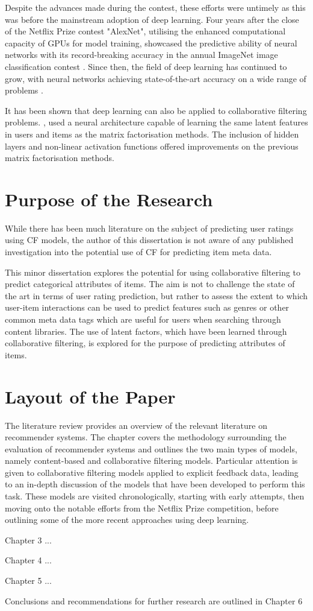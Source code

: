 Despite the advances made during the contest, these efforts were untimely as this was before the mainstream adoption of deep learning. Four years after the close of the Netflix Prize contest "AlexNet", utilising the enhanced computational capacity of GPUs for model training, showcased the predictive ability of neural networks with its record-breaking accuracy in the annual ImageNet image classification contest \parencite{krizhevsky2012imagenet}. Since then, the field of deep learning has continued to grow, with neural networks achieving state-of-the-art accuracy on a wide range of problems \parencite{alom2018history}.

It has been shown that deep learning can also be applied to collaborative filtering problems. \cite{he2017neural}, used a neural architecture capable of learning the same latent features in users and items as the matrix factorisation methods. The inclusion of hidden layers and non-linear activation functions offered improvements on the previous matrix factorisation methods.



\section{Purpose of the Research}
While there has been much literature on the subject of predicting user ratings using CF models, the author of this dissertation is not aware of any published investigation into the potential use of CF for predicting item meta data.

This minor dissertation explores the potential for using collaborative filtering to predict categorical attributes of items. The aim is not to challenge the state of the art in terms of user rating prediction, but rather to assess the extent to which user-item interactions can be used to predict features such as genres or other common meta data tags which are useful for users when searching through content libraries. The use of latent factors, which have been learned through collaborative filtering, is explored for the purpose of predicting attributes of items.

\section{Layout of the Paper}
The literature review provides an overview of the relevant literature on recommender systems. The chapter covers the methodology surrounding the evaluation of recommender systems and outlines the two main types of models, namely content-based and collaborative filtering models. Particular attention is given to collaborative filtering models applied to explicit feedback data, leading to an in-depth discussion of the models that have been developed to perform this task. These models are visited chronologically, starting with early attempts, then moving onto the notable efforts from the Netflix Prize competition, before outlining some of the more recent approaches using deep learning.

Chapter 3 ...

Chapter 4 ...

Chapter 5 ...

Conclusions and recommendations for further research are outlined in Chapter 6


 